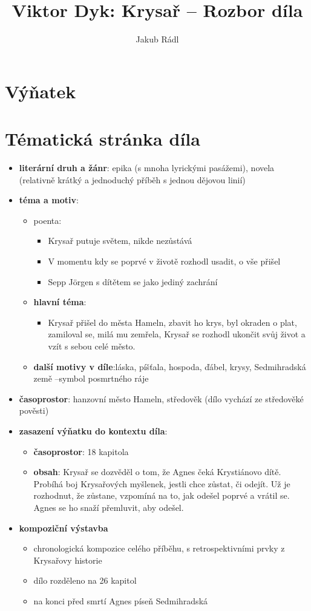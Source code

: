 \documentclass[10pt,a4paper]{article}
\date{}
\author{Jakub Rádl}
\title{Viktor Dyk: Krysař -- Rozbor díla}
\begin{document}
\maketitle

\section*{Výňatek}

\section*{Tématická stránka díla}
\begin{itemize}
\item \textbf{literární druh a žánr}: epika (s mnoha lyrickými pasážemi), novela (relativně krátký a jednoduchý příběh s jednou dějovou linií)
\item \textbf{téma a motiv}:
	\begin{itemize}
	\item poenta:
		\begin{itemize}
		\item Krysař putuje světem, nikde nezůstává
		\item V momentu kdy se poprvé v životě rozhodl usadit, o vše přišel
		\item Sepp Jörgen s dítětem se jako jediný zachrání
		\end{itemize}
	\item \textbf{hlavní téma}: 
		\begin{itemize}
		\item Krysař přišel do města Hameln, zbavit ho krys, byl okraden o plat, zamiloval se, milá mu zemřela, Krysař se rozhodl ukončit svůj život a vzít s sebou celé město.
		\end{itemize}
	\item \textbf{další motivy v díle}:láska, píšťala, hospoda, ďábel, krysy, Sedmihradská země --symbol posmrtného ráje
	\end{itemize}
\item \textbf{časoprostor}: hanzovní město Hameln, středověk (dílo vychází ze středověké pověsti)
\item \textbf{zasazení výňatku do kontextu díla}:
	\begin{itemize}
	\item \textbf{časoprostor}: 18 kapitola
	\item \textbf{obsah}: Krysař se dozvěděl o tom, že Agnes čeká Krystiánovo dítě. Probíhá boj Krysařových myšlenek, jestli chce zůstat, či odejít. Už je rozhodnut, že zůstane, vzpomíná na to, jak odešel poprvé a vrátil se. Agnes se ho snaží přemluvit, aby odešel. 
	\end{itemize}
\item \textbf{kompoziční výstavba}
	\begin{itemize}
	\item chronologická kompozice celého příběhu, s retrospektivními prvky z Krysařovy historie
	\item dílo rozděleno na 26 kapitol
	\item na konci před smrtí Agnes píseň Sedmihradská
	\end{itemize}
\end{itemize}
\end{document}
